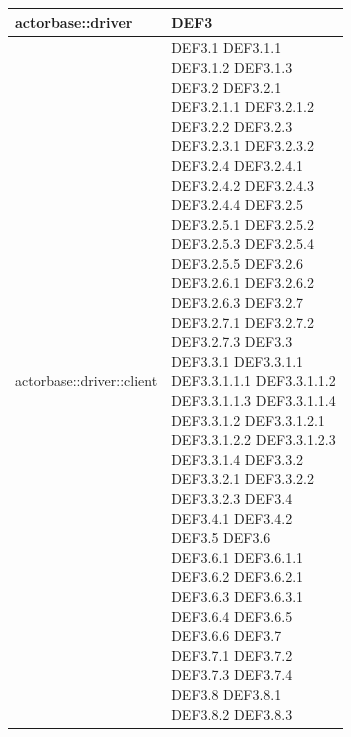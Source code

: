 \documentclass{scalatekids-article}
\begin{document}
\begin{longtable}[H]{|p{9cm}|p{8cm}|}
\hline
actorbase::driver & \multiLineCell[t]{DEF3\\}\\
\hline
actorbase::driver::client & \multiLineCell[t]{DEF3.1 DEF3.1.1\\DEF3.1.2 DEF3.1.3\\DEF3.2 DEF3.2.1\\DEF3.2.1.1 DEF3.2.1.2\\DEF3.2.2 DEF3.2.3\\DEF3.2.3.1 DEF3.2.3.2\\DEF3.2.4 DEF3.2.4.1\\DEF3.2.4.2 DEF3.2.4.3\\DEF3.2.4.4 DEF3.2.5\\DEF3.2.5.1 DEF3.2.5.2\\DEF3.2.5.3 DEF3.2.5.4\\DEF3.2.5.5 DEF3.2.6\\DEF3.2.6.1 DEF3.2.6.2\\DEF3.2.6.3 DEF3.2.7\\DEF3.2.7.1 DEF3.2.7.2\\DEF3.2.7.3 DEF3.3\\DEF3.3.1 DEF3.3.1.1\\DEF3.3.1.1.1 DEF3.3.1.1.2\\DEF3.3.1.1.3 DEF3.3.1.1.4\\DEF3.3.1.2 DEF3.3.1.2.1\\DEF3.3.1.2.2 DEF3.3.1.2.3\\DEF3.3.1.4 DEF3.3.2\\DEF3.3.2.1 DEF3.3.2.2\\DEF3.3.2.3 DEF3.4\\DEF3.4.1 DEF3.4.2\\DEF3.5 DEF3.6\\DEF3.6.1 DEF3.6.1.1\\DEF3.6.2 DEF3.6.2.1\\DEF3.6.3 DEF3.6.3.1\\DEF3.6.4 DEF3.6.5\\DEF3.6.6 DEF3.7\\DEF3.7.1 DEF3.7.2\\DEF3.7.3 DEF3.7.4\\DEF3.8 DEF3.8.1\\DEF3.8.2 DEF3.8.3\\}\\
\hline

\end{longtable}
\end{document}
